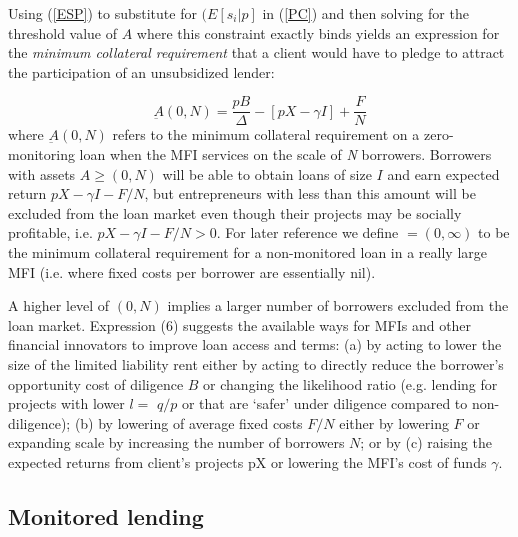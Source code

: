 \documentclass[letterpaper, 12pt]{article}
\begin{document}
Using (\ref{ESP}) to substitute for $(E\left\lbrack s_{i}|p \right\rbrack$ in (\ref{PC}) and then solving for the threshold value of \(A\) where this
constraint exactly binds yields an expression for the \emph{minimum collateral requirement} that a client would have to pledge to attract
the participation of an unsubsidized lender:

\begin{equation}
\underbar A(0,N) = \frac{pB}{\Delta} - \left\lbrack pX - \gamma I \right\rbrack + \frac{F}{N}
\end{equation}
where $\underbar A(0,N)$ refers to the minimum collateral requirement on a zero-monitoring loan when the MFI services on the scale of \emph{N} borrowers. Borrowers with assets \(A \geq (0,N)\) will be able to obtain loans of size \(I\)
and earn expected return \(pX - \gamma I - F/N\), but entrepreneurs with less than this amount will be excluded from the loan market even though
their projects may be socially profitable, i.e.
\(pX - \gamma I - F/N > 0.\) For later reference we define \(= (0,\infty)\) to be the minimum collateral requirement for a non-monitored loan in a really large MFI (i.e. where fixed costs per
borrower are essentially nil).

A higher level of \((0,N)\) implies a larger number of borrowers
excluded from the loan market. Expression (6) suggests the available
ways for MFIs and other financial innovators to improve loan access and
terms: (a) by acting to lower the size of the limited liability rent
either by acting to directly reduce the borrower's opportunity cost of
diligence \(B\) or changing the likelihood ratio (e.g. lending for
projects with lower \(l =\) \(q/p\) or that are `safer' under diligence
compared to non-diligence); (b) by lowering of average fixed costs
\(F/N\) either by lowering \(F\) or expanding scale by increasing the
number of borrowers \(N\); or by (c) raising the expected returns from
client's projects \(\text{pX}\) or lowering the MFI's cost of funds
\(\gamma\).


\subsection{Monitored lending}\label{monitored-lending}
\end{document}
